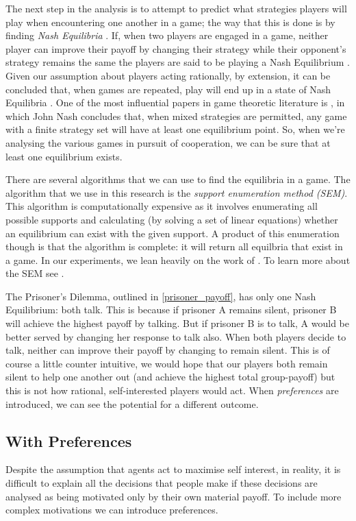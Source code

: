 \documentclass[11pt]{book}
\newcommand*{\np}{\par\noindent\newline}
\begin{document}
\np The next step in the analysis is to attempt to predict what strategies players will play when encountering one
another in a game; the way that this is done is by finding \textit{Nash Equilibria} \citep{nash_equilibrium_1950}.
If, when two players are engaged in a game, neither player can improve their payoff by changing their strategy while their opponent's strategy remains the
same the players are said to be playing a Nash Equilibrium \citep{angner_course_2012}.
Given our assumption about players acting rationally, by extension, it can be concluded that, when games are repeated, play will end up in a state
of Nash Equilibria \citep{kalai_rational_1993}. 
One of the most influential papers in game theoretic literature is \citet{nash_equilibrium_1950}, in which John
Nash concludes that, when mixed strategies are permitted, any game with a finite strategy set will have at least one
equilibrium point. So, when we're analysing the various games in pursuit of cooperation, we can be sure that at
least one equilibrium exists.

\np There are several algorithms that we can use to find the equilibria in a game.
The algorithm that we use in this research is the \textit{support enumeration method (SEM)}.
This algorithm is computationally expensive as it involves enumerating all possible supports and calculating (by solving a set of linear equations)
whether an equilibrium can exist with the given support.
A product of this enumeration though is that the algorithm is complete: it will return all equilbria that exist in a game.
In our experiments, we lean heavily on the work of \citet{knight_nashpy_2017}.
To learn more about the SEM see \citet[~p. 103]{shoham_multiagent_2008}.

\np The Prisoner's Dilemma, outlined in \ref{prisoner_payoff}, has only one Nash Equilibrium: both talk. 
This is because if prisoner A remains silent, prisoner B will achieve the highest payoff by talking. 
But if prisoner B is to talk, A would be better served by changing her response to talk also. 
When both players decide to talk, neither can improve their payoff by changing to remain silent. 
This is of course a little counter intuitive, we would hope that our players both remain silent to help one another out (and achieve the highest total group-payoff) but this is not
how rational, self-interested players would act. 
When \textit{preferences} are introduced, we can see the potential for a different outcome.

\subsection{With Preferences}\label{with_preferences}
Despite the assumption that agents act to maximise self interest, in reality,
it is difficult to explain all the decisions that people make if these decisions are analysed as being motivated only by their own material payoff. 
To include more complex motivations we can introduce preferences. 
\end{document}
